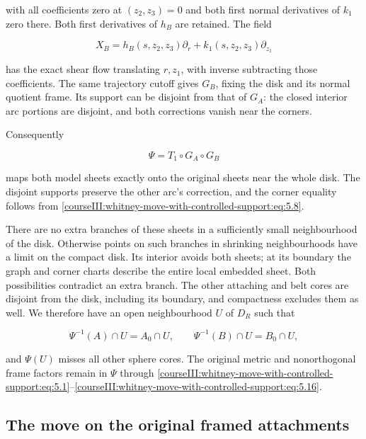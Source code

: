 with all coefficients zero at \((z_2,z_3)=0\) and both first normal derivatives of \(k_1\) zero there. Both first derivatives of \(h_B\) are retained. The field

\begin{equation}
X_B=h_B(s,z_2,z_3)\partial_r+
k_1(s,z_2,z_3)\partial_{z_1}
\label{courseIII:whitney-move-with-controlled-support:eq:5.15}
\end{equation}

has the exact shear flow translating \(r,z_1\), with inverse subtracting those coefficients. The same trajectory cutoff gives \(G_B\), fixing the disk and its normal quotient frame. Its support can be disjoint from that of \(G_A\): the closed interior arc portions are disjoint, and both corrections vanish near the corners.

Consequently

\begin{equation}
\Psi=T_1\circ G_A\circ G_B
\label{courseIII:whitney-move-with-controlled-support:eq:5.16}
\end{equation}

maps both model sheets exactly onto the original sheets near the whole disk. The disjoint supports preserve the other arc's correction, and the corner equality follows from \eqref{courseIII:whitney-move-with-controlled-support:eq:5.8}.

There are no extra branches of these sheets in a sufficiently small neighbourhood of the disk. Otherwise points on such branches in shrinking neighbourhoods have a limit on the compact disk. Its interior avoids both sheets; at its boundary the graph and corner charts describe the entire local embedded sheet. Both possibilities contradict an extra branch. The other attaching and belt cores are disjoint from the disk, including its boundary, and compactness excludes them as well. We therefore have an open neighbourhood \(U\) of \(D_R\) such that

\begin{equation}
\Psi^{-1}(A)\cap U=A_0\cap U,\qquad
\Psi^{-1}(B)\cap U=B_0\cap U,
\label{courseIII:whitney-move-with-controlled-support:eq:5.17}
\end{equation}

and \(\Psi(U)\) misses all other sphere cores. The original metric and nonorthogonal frame factors remain in \(\Psi\) through \eqref{courseIII:whitney-move-with-controlled-support:eq:5.1}--\eqref{courseIII:whitney-move-with-controlled-support:eq:5.16}.

\subsection{The move on the original framed attachments}
\label{courseIII:whitney-move-with-controlled-support:move-receiving-attachments}

